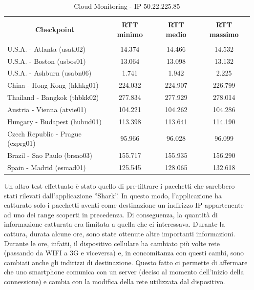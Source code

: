 \documentclass[a4paper,11pt]{book}
\begin{document}
\begin{table}[!ht]
\begin{tabular}{|l|c|c|c|}
\hline
\multicolumn{1}{|c|}{\textbf{}} & {\textbf{}} & {\textbf{}} & {\textbf{}}\\
\multicolumn{1}{|c|}{\textbf{Checkpoint}} & {\textbf{RTT minimo}} & {\textbf{RTT medio}} & {\textbf{RTT massimo}}\\
\multicolumn{1}{|c|}{\textbf{}} & {\textbf{}} & {\textbf{}} & {\textbf{}}\\
\hline
U.S.A. - Atlanta (usatl02) & 14.374 & 14.466 & 14.532\\
U.S.A. - Boston (usbos01) & 13.064 & 13.098 & 13.132\\
U.S.A. - Ashburn (usabn06) & 1.741 & 1.942 & 2.225\\
China - Hong Kong (hkhkg01) & 224.032 & 224.907 & 226.799\\
Thailand - Bangkok (thbkk02) & 277.834 & 277.929 & 278.014\\
Austria - Vienna (atvie01) & 104.221 & 104.262 & 104.286\\
Hungary - Budapest (hubud01) & 113.398 & 113.641 & 114.190\\
Czech Republic - Prague (czprg01) & 95.966 & 96.028 & 96.099\\
Brazil - Sao Paulo (brsao03) & 155.717 & 155.935 & 156.290\\
Spain - Madrid (esmad01) & 125.545 & 128.065 & 132.618\\
\hline
\end{tabular}
\caption{Cloud Monitoring - IP 50.22.225.85}\label{table:Monitoring_5}
\end{table}

\clearpage

Un altro test effettuato \`e stato quello di pre-filtrare i pacchetti che sarebbero stati rilevati dall'applicazione ''Shark''. In questo modo, l'applicazione ha catturato solo i pacchetti aventi come destinazione un indirizzo IP appartenente ad uno dei range scoperti in precedenza.
Di conseguenza, la quantit\`a di informazione catturata era limitata a quella che ci interessava.
Durante la cattura, durata alcune ore, sono state ottenute altre importanti informazioni. Durante le ore, infatti, il dispositivo cellulare ha cambiato più volte rete (passando da WIFI a 3G e viceversa) e, in concomitanza con questi cambi, sono cambiati anche gli indirizzi di destinazione.
Questo fatto ci permette di affermare che uno smartphone comunica con un server (deciso al momento dell'inizio della connessione) e cambia con la modifica della rete utilizzata dal dispositivo.
\end{document}
